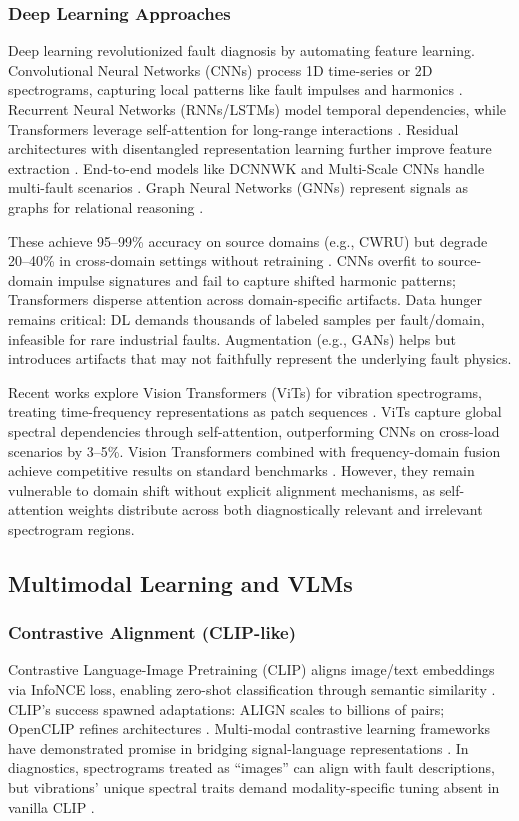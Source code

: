 \subsubsection{Deep Learning Approaches}
Deep learning revolutionized fault diagnosis by automating feature learning. Convolutional Neural Networks (CNNs) process 1D time-series or 2D spectrograms, capturing local patterns like fault impulses and harmonics \cite{cite12,cite13}. Recurrent Neural Networks (RNNs/LSTMs) model temporal dependencies, while Transformers leverage self-attention for long-range interactions \cite{cite14}. Residual architectures with disentangled representation learning further improve feature extraction \cite{cite37}. End-to-end models like DCNNWK and Multi-Scale CNNs handle multi-fault scenarios \cite{cite35}. Graph Neural Networks (GNNs) represent signals as graphs for relational reasoning \cite{cite36}.

These achieve 95--99\% accuracy on source domains (e.g., CWRU) but degrade 20--40\% in cross-domain settings without retraining \cite{cite17,cite31}. CNNs overfit to source-domain impulse signatures and fail to capture shifted harmonic patterns; Transformers disperse attention across domain-specific artifacts. Data hunger remains critical: DL demands thousands of labeled samples per fault/domain, infeasible for rare industrial faults. Augmentation (e.g., GANs) helps but introduces artifacts that may not faithfully represent the underlying fault physics.

Recent works explore Vision Transformers (ViTs) for vibration spectrograms, treating time-frequency representations as patch sequences \cite{cite31}. ViTs capture global spectral dependencies through self-attention, outperforming CNNs on cross-load scenarios by 3--5\%. Vision Transformers combined with frequency-domain fusion achieve competitive results on standard benchmarks \cite{cite41}. However, they remain vulnerable to domain shift without explicit alignment mechanisms, as self-attention weights distribute across both diagnostically relevant and irrelevant spectrogram regions.

\subsection{Multimodal Learning and VLMs}
\subsubsection{Contrastive Alignment (CLIP-like)}
Contrastive Language-Image Pretraining (CLIP) aligns image/text embeddings via InfoNCE loss, enabling zero-shot classification through semantic similarity \cite{cite20}. CLIP's success spawned adaptations: ALIGN scales to billions of pairs; OpenCLIP refines architectures \cite{cite27,cite28}. Multi-modal contrastive learning frameworks have demonstrated promise in bridging signal-language representations \cite{cite39}. In diagnostics, spectrograms treated as ``images'' can align with fault descriptions, but vibrations' unique spectral traits demand modality-specific tuning absent in vanilla CLIP \cite{cite29}.

